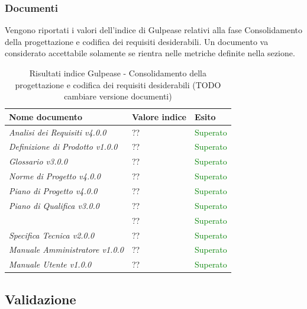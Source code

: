 	 	\subsubsection{Documenti}	 	
	 	Vengono riportati i valori dell'indice di Gulpease relativi alla fase Consolidamento della progettazione e codifica dei requisiti desiderabili. Un documento va considerato accettabile solamente se rientra nelle metriche definite nella sezione.
		\begin{table}[!ht]
			\begin{center}
				\begin{tabularx}{0.9\textwidth}{|l|l|X|}
					\hline
					\textbf{Nome documento} & \textbf{Valore indice} & \textbf{Esito}\\
					\hline						
					\emph{Analisi dei Requisiti v4.0.0} & ?? & \textcolor{green}{Superato}\\
					\hline
					\emph{Definizione di Prodotto v1.0.0} & ?? & \textcolor{green}{Superato}\\
					\hline
					\emph{Glossario v3.0.0} & ?? & \textcolor{green}{Superato}\\
					\hline					
					\emph{Norme di Progetto v4.0.0} & ?? & \textcolor{green}{Superato}\\
					\hline					
					\emph{Piano di Progetto v4.0.0} & ?? & \textcolor{green}{Superato}\\
					\hline					
					\emph{Piano di Qualifica v3.0.0} & ?? & \textcolor{green}{Superato}\\
					\hline					
					\docNameVersionSdF & ?? & \textcolor{green}{Superato}\\
					\hline	
					\emph{Specifica Tecnica v2.0.0} & ?? & \textcolor{green}{Superato}\\
					\hline
					\emph{Manuale Amministratore v1.0.0} & ?? & \textcolor{green}{Superato}\\
					\hline
					\emph{Manuale Utente v1.0.0} & ?? & \textcolor{green}{Superato}\\			
					\hline	
					\hline			
				\end{tabularx}
			\end{center}
			\caption{Risultati indice Gulpease - Consolidamento della progettazione e codifica dei requisiti desiderabili (TODO cambiare versione documenti)}
		\end{table}

	\subsection{Validazione}
